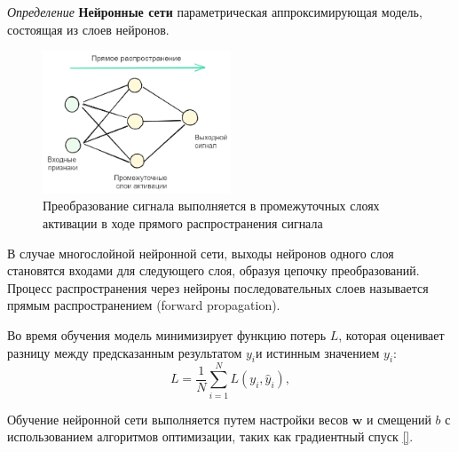 \textit{Определение} \textbf{Нейронные сети} параметрическая аппроксимирующая модель, состоящая из слоев нейронов.

\begin{figure}[h]
  \centering
  \includegraphics[width=0.5\textwidth]{assets/ml/nn/nn.excalidraw.png}
  \caption{Преобразование сигнала выполняется в промежуточных слоях активации в ходе прямого распространения сигнала}
  \label{neural_net}
\end{figure}

В случае многослойной нейронной сети, выходы нейронов одного слоя становятся входами для следующего слоя, 
образуя цепочку преобразований. Процесс распространения через нейроны последовательных слоев называется 
прямым распространением (forward propagation).

Во время обучения модель минимизирует функцию потерь \( L \), которая оценивает разницу между предсказанным 
результатом $y_i$и истинным значением $y_i$:
\begin{equation}
  L = \frac{1}{N} \sum_{i=1}^{N} L(y_i, \hat{y}_i),
\end{equation}

Обучение нейронной сети выполняется путем настройки весов \( \mathbf{w} \) и смещений \( b \) 
с использованием алгоритмов оптимизации, таких как градиентный спуск \ref{}. 
